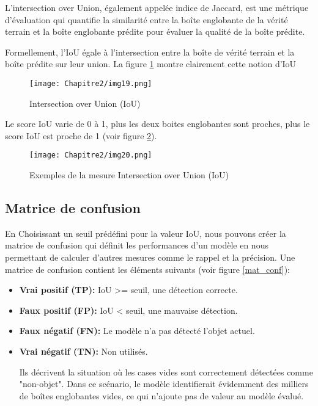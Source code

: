 L'intersection over Union, également appelée indice de Jaccard, est une métrique d'évaluation qui quantifie la similarité entre la boîte englobante de la vérité terrain  et la boîte englobante prédite pour évaluer la qualité de la boîte prédite. 

Formellement, l'IoU égale à l'intersection entre la boîte de vérité terrain et la boîte prédite sur leur union. La figure \ref{img19} montre clairement cette notion d'IoU
          \begin{figure}[H]
               \centering
               \texttt{[image: Chapitre2/img19.png]}
               \caption{Intersection over Union (IoU)}
               \label{img19}
               \end{figure}

Le score IoU varie de 0 à 1, plus les deux boites englobantes sont proches, plus le score IoU est proche de 1 (voir figure \ref{img20}).
          \begin{figure}[H]
               \centering
               \texttt{[image: Chapitre2/img20.png]}
               \caption{Exemples de la mesure Intersection over Union (IoU)}
               \label{img20}
               \end{figure}

\subsection{Matrice de confusion}

En Choisissant un seuil prédéfini pour la valeur IoU, nous pouvons créer la matrice de confusion qui définit les performances d'un modèle en nous permettant de calculer d'autres mesures comme le rappel et la précision. Une matrice de confusion contient les éléments suivants (voir figure \ref{mat_conf}):\\

\begin{itemize}
\item \textbf{Vrai positif (TP):} IoU >= seuil, une détection correcte. \\

\item \textbf{Faux positif (FP):} IoU < seuil, une mauvaise détection.\\

\item \textbf{Faux négatif (FN):} Le modèle n'a pas détecté l'objet actuel.\\

\item \textbf{Vrai négatif (TN):} Non utilisés.

Ils décrivent la situation où les cases vides sont correctement détectées comme "non-objet". Dans ce scénario, le modèle identifierait évidemment des milliers de boîtes englobantes vides, ce qui n'ajoute pas de valeur au modèle évalué. \\

\end{itemize}
         
